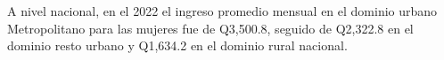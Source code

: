A nivel nacional, en el 2022 el ingreso promedio mensual en el dominio urbano Metropolitano para las mujeres fue de Q3,500.8, seguido de Q2,322.8 en el dominio resto urbano y Q1,634.2 en el dominio rural nacional. 